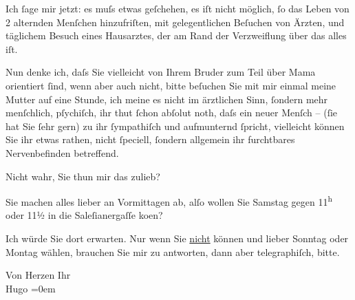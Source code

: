 \pstart
           Ich ſage mir jetzt: es muſs {\pb}etwas
               geſchehen, es iſt nicht möglich, ſo das Leben von 2 alternden Menſchen hinzufriſten,
               mit gelegentlichen Beſuchen von Ärzten, und täglichem Besuch eines Hausarztes, der am Rand der
               Verzweiflung über das alles iſt.\pend
           
\pstart
           Nun denke ich, daſs Sie vielleicht von Ihrem Bruder zum Teil über Mama orientiert ſind, wenn aber auch nicht, bitte {\pb}beſuchen Sie mit mir einmal meine
                  Mutter auf eine Stunde,
               ich meine es nicht im ärztlichen Sinn, ſondern mehr menſchlich, pſychiſch, ihr thut
               ſchon abſolut noth, daſs ein neuer Menſch – (ſie hat Sie ſehr gern) zu ihr
               ſympathiſch und aufmunternd ſpricht, vielleicht können Sie ihr etwas rathen, nicht
               ſpeciell, ſondern allgemein ihr furchtbares Nervenbefinden betreffend.\pend
           
\pstart
           Nicht wahr, Sie thun mir {\pb}das
               zulieb?\pend
           
\pstart
           Sie machen alles lieber an Vormittagen ab, alſo wollen Sie Samstag gegen
                     11\textsuperscript{h} oder 11½ in die Saleſianergaſſe ko{\geminationm}en?\pend
           
\pstart
           Ich würde Sie dort erwarten. Nur wenn Sie \uline{nicht}
               können und lieber Sonntag oder Montag wählen, brauchen Sie
               mir zu antworten, dann {\pb}aber
               telegraphiſch, bitte.\pend
           
\pstart
           Von Herzen Ihr{\\[\baselineskip]}\spacefill\mbox{Hugo}\pend
           \leftskip=0em{}\endnumbering{}  
      